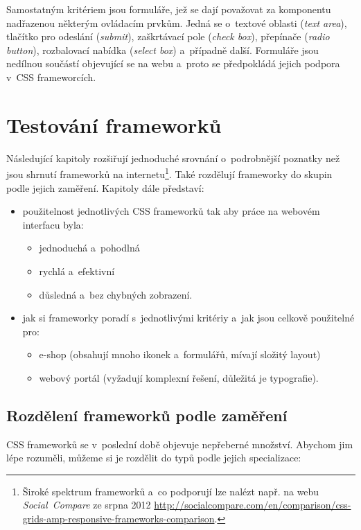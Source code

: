 \documentclass[thesis=B,czech]{FITthesis}[2012/06/26]
\begin{document}
Samostatným kritériem jsou formuláře, jež se dají považovat za komponentu nadřazenou některým ovládacím prvkům. Jedná se o~textové oblasti (\textit{text area}), tlačítko pro odeslání (\textit{submit}), zaškrtávací pole (\textit{check box}), přepínače (\textit{radio button}), rozbalovací nabídka (\textit{select box}) a~případně další. Formuláře jsou nedílnou součástí objevující se na webu a~proto se předpokládá jejich podpora v~CSS frameworcích.

\chapter{Testování frameworků}
Následující kapitoly rozšiřují jednoduché srovnání o~podrobnější poznatky než jsou shrnutí frameworků na internetu\footnote{Široké spektrum frameworků a~co podporují lze nalézt např. na webu \textit{Social~Compare} ze srpna 2012 \url{http://socialcompare.com/en/comparison/css-grids-amp-responsive-frameworks-comparison}.}. Také rozdělují frameworky  do skupin podle jejich zaměření. 
Kapitoly dále představí:

\begin{itemize}
  \item použitelnost jednotlivých CSS frameworků tak aby práce na webovém interfacu byla:
	\begin{itemize}
 	\item jednoduchá a~pohodlná
 	\item rychlá a~efektivní
 	\item důsledná a~bez chybných zobrazení.
	\end{itemize}

 \item jak si frameworky poradí s~jednotlivými kritériy a~jak jsou celkově použitelné pro:

\begin{itemize}
 \item e-shop (obsahují mnoho ikonek a~formulářů, mívají složitý layout)
 \item webový portál (vyžadují komplexní řešení, důležitá je typografie).
\end{itemize}
\end{itemize}
\section{Rozdělení frameworků podle zaměření}

CSS frameworků se v~poslední době objevuje nepřeberné množství. Abychom jim lépe rozuměli, můžeme si je rozdělit do typů podle jejich specializace:
\end{document}

